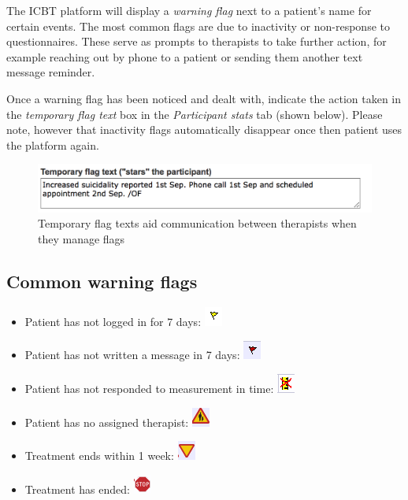 \documentclass[]{book}
\providecommand{\tightlist}{%
  \setlength{\itemsep}{0pt}\setlength{\parskip}{0pt}}
\theoremstyle{definition}
\theoremstyle{definition}
\theoremstyle{definition}
\theoremstyle{remark}
\begin{document}
The ICBT platform will display a \emph{warning flag} next to a patient's
name for certain events. The most common flags are due to inactivity or
non-response to questionnaires. These serve as prompts to therapists to
take further action, for example reaching out by phone to a patient or
sending them another text message reminder.

Once a warning flag has been noticed and dealt with, indicate the action
taken in the \emph{temporary flag text} box in the \emph{Participant
stats} tab (shown below). Please note, however that inactivity flags
automatically disappear once then patient uses the platform again.

\begin{figure}
\centering
\includegraphics{images/temporary-flag-text.png}
\caption{Temporary flag texts aid communication between therapists when
they manage flags}
\end{figure}

\hypertarget{common-warning-flags}{%
\subsection{Common warning flags}\label{common-warning-flags}}

\begin{itemize}
\tightlist
\item
  Patient has not logged in for 7 days:
  \includegraphics{images/login-inactivity-flag.png}
\item
  Patient has not written a message in 7 days:
  \includegraphics{images/message-inactivity-flag.png}
\item
  Patient has not responded to measurement in time:
  \includegraphics{images/measurement-delay-flag.png}
\item
  Patient has no assigned therapist:
  \includegraphics{images/notherapist-flag.png}
\item
  Treatment ends within 1 week:
  \includegraphics{images/oneweek-therapyends-flag.png}
\item
  Treatment has ended: \includegraphics{images/therapy-ended-flag.png}
\end{itemize}
\end{document}
